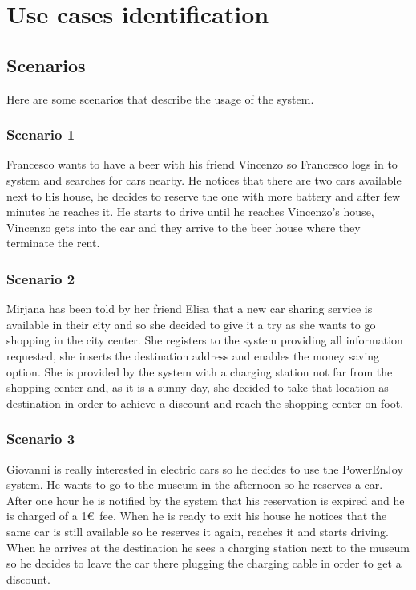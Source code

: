 \section{Use cases identification}
\subsection{Scenarios}
Here are some scenarios that describe the usage of the system.
\subsubsection{Scenario 1}
\label{scenario:1}
Francesco wants to have a beer with his friend Vincenzo so Francesco logs in to system and searches for cars nearby. He notices that there are two cars available next to his house, he decides to reserve the one with more battery and after few minutes he reaches it. He starts to drive until he reaches Vincenzo's house, Vincenzo gets into the car and they arrive to the beer house where they terminate the rent.

\subsubsection{Scenario 2}
\label{scenario:2}
Mirjana has been told by her friend Elisa that a new car sharing service is available in their city and so she decided to give it a try as she wants to go shopping in the city center. She registers to the system providing all information requested, she inserts the destination address and enables the money saving option. She is provided by the system with a charging station not far from the shopping center and, as it is a sunny day, she decided to take that location as destination in order to achieve a discount and reach the shopping center on foot. 

\subsubsection{Scenario 3}
\label{scenario:3}
Giovanni is really interested in electric cars so he decides to use the PowerEnJoy system. He wants to go to the museum in the afternoon so he reserves a car. After one hour he is notified by the system that his reservation is expired and he is charged of a 1\euro\ fee. When he is ready to exit his house he notices that the same car is still available so he reserves it again, reaches it and starts driving. When he arrives at the destination he sees a charging station next to the museum so he decides to leave the car there plugging the charging cable in order to get a discount.

